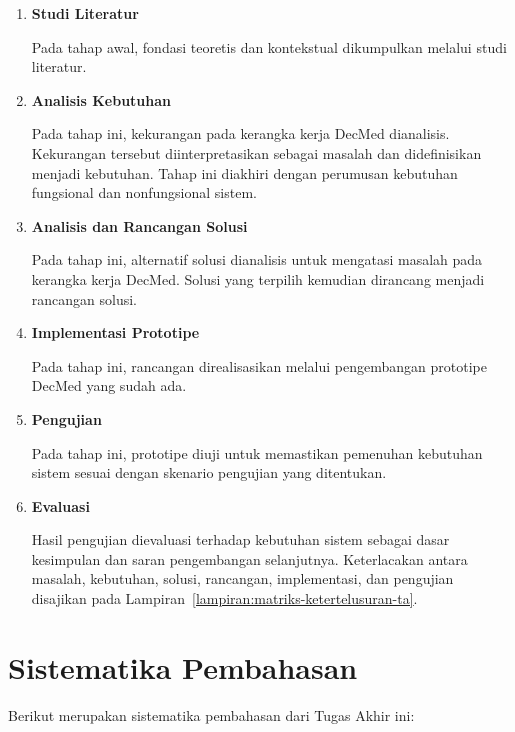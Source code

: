 \documentclass[bahasa, 12pt, a4paper, onecolumn, oneside, final]{report}
\begin{document}
\begin{enumerate}
	\item \textbf{Studi Literatur}
	      \label{subsec:studi-literatur}

	      Pada tahap awal, fondasi teoretis dan kontekstual dikumpulkan melalui studi literatur.

	\item \textbf{Analisis Kebutuhan}
	      \label{subsec:analisis-kebutuhan}

	      Pada tahap ini, kekurangan pada kerangka kerja DecMed dianalisis. Kekurangan tersebut diinterpretasikan sebagai masalah dan didefinisikan menjadi kebutuhan. Tahap ini diakhiri dengan perumusan kebutuhan fungsional dan nonfungsional sistem.

	\item \textbf{Analisis dan Rancangan Solusi}
	      \label{subsec:perancangan-arsitektur-dan-model-kontrol-akses}

	      Pada tahap ini, alternatif solusi dianalisis untuk mengatasi masalah pada kerangka kerja DecMed. Solusi yang terpilih kemudian dirancang menjadi rancangan solusi.

	\item \textbf{Implementasi Prototipe}
	      \label{subsec:implementasi-prototipe}

	      Pada tahap ini, rancangan direalisasikan melalui pengembangan prototipe DecMed yang sudah ada.

	\item \textbf{Pengujian}
	      \label{subsec:pengujian}

	      Pada tahap ini, prototipe diuji untuk memastikan pemenuhan kebutuhan sistem sesuai dengan skenario pengujian yang ditentukan.

	\item \textbf{Evaluasi}
	      \label{subsec:evaluasi}

	      Hasil pengujian dievaluasi terhadap kebutuhan sistem sebagai dasar kesimpulan dan saran pengembangan selanjutnya. Keterlacakan antara masalah, kebutuhan, solusi, rancangan, implementasi, dan pengujian disajikan pada Lampiran~\ref{lampiran:matriks-ketertelusuran-ta}.
\end{enumerate}

\section{Sistematika Pembahasan}
\label{sec:sistematika-pembahasan}

Berikut merupakan sistematika pembahasan dari Tugas Akhir ini:
\end{document}

